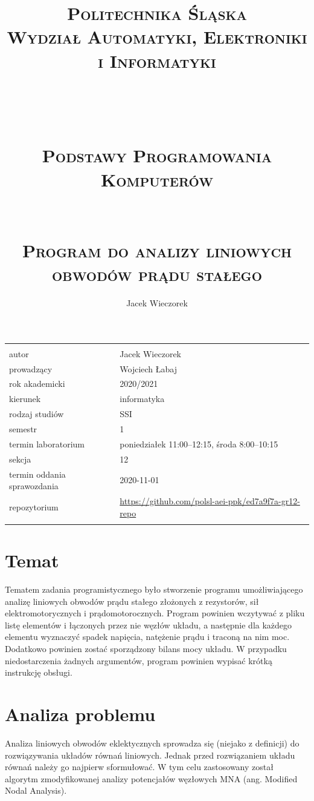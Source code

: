 \documentclass[11pt, final]{article}
\title{\scshape \large Politechnika Śląska \\ Wydział Automatyki, Elektroniki i Informatyki  \\ ~ \\ ~ \\ ~ \\ \huge Podstawy Programowania Komputerów \large \\ ~ \\ ~ \\ Program do analizy liniowych obwodów prądu stałego}
\author{Jacek Wieczorek}
\begin{document}
\maketitle

\begin{table}[bp]
\centering
\begin{tabular}{l l}
\hline\\
autor & Jacek Wieczorek \\
prowadzący & Wojciech Łabaj \\
rok akademicki & 2020/2021 \\
kierunek & informatyka \\
rodzaj studiów & SSI \\
semestr & 1 \\
termin laboratorium & poniedziałek 11:00--12:15, środa 8:00--10:15 \\
sekcja & 12 \\
termin oddania sprawozdania & 2020-11-01 \\
repozytorium & \url{https://github.com/polsl-aei-ppk/ed7a9f7a-gr12-repo} \\
\\ \hline
\end{tabular}
\end{table}


\thispagestyle{empty}
\newpage

\section{Temat}
Tematem zadania programistycznego było stworzenie programu umożliwiającego analizę liniowych
obwodów prądu stałego złożonych z rezystorów, sił elektromotorycznych i prądomotorocznych. Program powinien
wczytywać z pliku listę elementów i łączonych przez nie węzłów układu, a następnie dla każdego elementu
wyznaczyć spadek napięcia, natężenie prądu i traconą na nim moc. Dodatkowo powinien zostać sporządzony bilans mocy układu. W przypadku niedostarczenia żadnych argumentów, program powinien wypisać krótką instrukcję obsługi.


\section{Analiza problemu}
Analiza liniowych obwodów eklektycznych sprowadza się (niejako z definicji) do rozwiązywania układów równań liniowych. Jednak przed rozwiązaniem układu równań należy go najpierw sformułować. W tym celu zastosowany został algorytm zmodyfikowanej analizy potencjałów węzłowych MNA\cite{mna} (ang. Modified Nodal Analysis).
\end{document}
